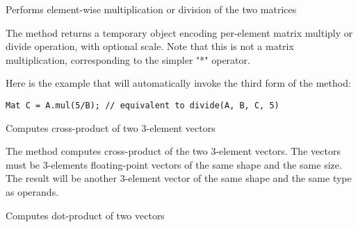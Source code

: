 Performs element-wise multiplication or division of the two matrices


\begin{description}
\end{description}

The method returns a temporary object encoding per-element matrix multiply or divide operation, with optional scale. Note that this is not a matrix multiplication, corresponding to the simpler "*" operator.

Here is the example that will automatically invoke the third form of the method:

\begin{lstlisting}
Mat C = A.mul(5/B); // equivalent to divide(A, B, C, 5)
\end{lstlisting}

Computes cross-product of two 3-element vectors

\begin{description}
\end{description}

The method computes cross-product of the two 3-element vectors. The vectors must be 3-elements floating-point vectors of the same shape and the same size. The result will be another 3-element vector of the same shape and the same type as operands.

Computes dot-product of two vectors

\begin{description}
\end{description}

